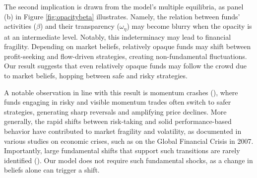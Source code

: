 
The second implication is drawn from the model's multiple equilibria, as panel (b) in Figure \ref{fig:opacitybeta} illustrates. Namely, the relation between funds' activities ($\beta$) and their transparency ($\omega_{\eta}$) may become blurry when the opacity is at an intermediate level. Notably, this indeterminacy may lead to financial fragility. Depending on market beliefs, relatively opaque funds may shift between profit-seeking and flow-driven strategies, creating non-fundamental fluctuations. Our result suggests that even relatively opaque funds may follow the crowd due to market beliefs, hopping between safe and risky strategies. 

A notable observation in line with this result is momentum crashes (\citealp{daniel2016momentum}), where funds engaging in risky and visible momentum trades often switch to safer strategies, generating sharp reversals and amplifying price declines. More generally, the rapid shifts between risk-taking and solid performance-based behavior have contributed to market fragility and volatility, as documented in various studies on economic crises, such as \citet{brunnermeier2009deciphering} on the Global Financial Crisis in 2007. Importantly, large fundamental shifts that support such transitions are rarely identified (\citealp{gennotte1999market}). Our model does not require such fundamental shocks, as a change in beliefs alone can trigger a shift.



